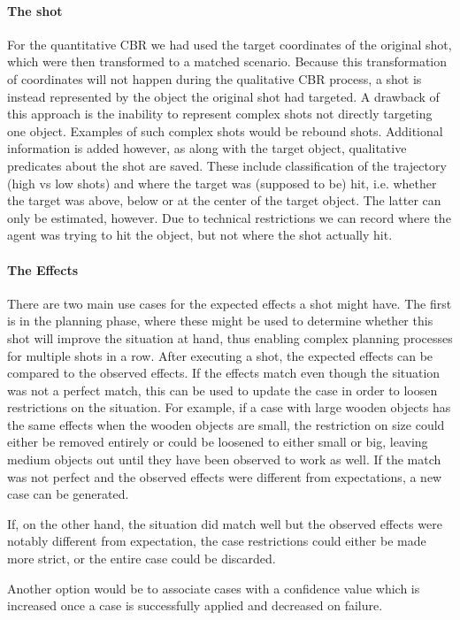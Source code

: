 \paragraph{The shot}
For the quantitative CBR we had used the target coordinates of the original shot, which were then transformed to a matched scenario.
Because this transformation of coordinates will not happen during the qualitative CBR process, a shot is instead represented by the object the original shot had targeted.
A drawback of this approach is the inability to represent complex shots not directly targeting one object.
Examples of such complex shots would be rebound shots.
Additional information is added however, as along with the target object, qualitative predicates about the shot are saved. These include classification of the trajectory (high vs low shots) and where the target was (supposed to be) hit, i.e. whether the target was above, below or at the center of the target object.
The latter can only be estimated, however. Due to technical restrictions we can record where the agent was trying to hit the object, but not where the shot actually hit.


\paragraph{The Effects}
There are two main use cases for the expected effects a shot might have. The first is in the planning phase, where these might be used to determine whether this shot will improve the situation at hand, thus enabling complex planning processes for multiple shots in a row.
After executing a shot, the expected effects can be compared to the observed effects. If the effects match even though the situation was not a perfect match, this can be used to update the case in order to loosen restrictions on the situation.
For example, if a case with large wooden objects has the same effects when the wooden objects are small, the restriction on size could either be removed entirely or could be loosened to either small or big, leaving medium objects out until they have been observed to work as well.
If the match was not perfect and the observed effects were different from expectations, a new case can be generated.

If, on the other hand, the situation did match well but the observed effects were notably different from expectation, the case restrictions could either be made more strict, or the entire case could be discarded.

Another option would be to associate cases with a confidence value which is increased once a case is successfully applied and decreased on failure.


